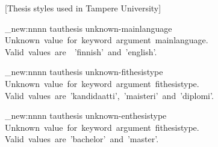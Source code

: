 %
%
%
%
%
%

[Thesis styles used in Tampere University]

\RequirePackage{ifluatex}

\ifluatex
\else
  \PackageError{tauthesis}{This class requires LuaLaTeX to compile}{Please compile your document with LuaLaTeX.}
  \expandafter\stop
\fi
%

\RequirePackage{expl3}


\ExplSyntaxOn


\makeatletter


\msg_new:nnnn
    { tauthesis }
    { unknown-mainlanguage }
    { Unknown~value~for~keyword~argument~mainlanguage. }
    { Valid~values~are~~'finnish'~and~'english'. }

\msg_new:nnnn
    { tauthesis }
    { unknown-fithesistype }
    { Unknown~value~for~keyword~argument~fithesistype. }
    { Valid~values~are~'kandidaatti',~'maisteri'~and~'diplomi'. }

\msg_new:nnnn
    { tauthesis }
    { unknown-enthesistype }
    { Unknown~value~for~keyword~argument~fithesistype. }
    { Valid~values~are~'bachelor'~and~'master'. }


\newif\if@customcitation\@customcitationtrue
\newif\if@apacitation\@apacitationfalse
\newif\if@ieeecitation\@ieeecitationfalse

\newif\if@langenglish\@langenglishfalse
\newif\if@taunotdraftmode\@taunotdraftmodetrue
\newif\if@programs\@programsfalse

